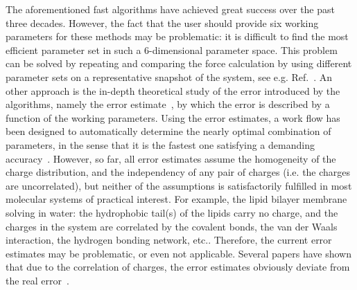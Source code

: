\documentclass[aps,pre,preprint,unsortedaddress]{revtex4}
\newcommand{\recheck}[1]{{\color{red} #1}}
\begin{document}
The aforementioned fast algorithms have achieved great success
over the past three decades.
However, the fact that the user should provide six working parameters
for these methods may be problematic: it is difficult to find the
most efficient parameter set in such a 6-dimensional parameter space.
\recheck{
  This problem can be solved by repeating and comparing
  the force calculation by
  using different parameter sets
  on a representative snapshot of the system,
  see e.g. Ref.~\cite{abraham2011optimization}.}
\recheck{An other approach is the 
  in-depth theoretical study}
of the error introduced by the algorithms, namely the
error estimate~\cite{kolafa1992cutoff, hummer1995numerical,
  petersen1995accuracy, deserno1998mue2, stern2008mesh,
  wang2010optimizing, neelov2010interlaced, ballenegger2012convert},
by which the error is described by a function of the working
parameters.  Using the error estimates, a work flow has been designed to
automatically determine the nearly optimal combination of parameters,
in the sense that it is the fastest one satisfying a demanding
accuracy~\cite{wang2010optimizing}. However, so far, all error
estimates assume the homogeneity of the charge distribution, and the
independency of any pair of charges (i.e. the charges are
uncorrelated), but neither of the assumptions is satisfactorily
fulfilled in most molecular
systems of practical interest.  For example, the lipid bilayer membrane
solving in water: the hydrophobic tail(s) of the lipids carry no charge, and
the charges in the system
are correlated by the covalent bonds, the van der Waals
interaction, the hydrogen bonding network, etc..  Therefore, the current
error estimates may be problematic, or even not applicable.  Several
papers have shown that due to the correlation of charges, the error estimates
obviously deviate from the real
error~\cite{deserno1998mue2,wang2010optimizing,ballenegger2012convert}.
\end{document}
